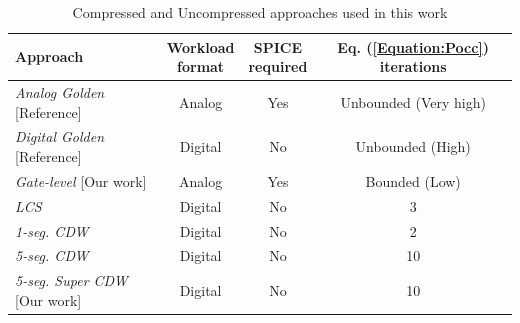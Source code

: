 \begin{table}
    \caption{Compressed and Uncompressed approaches used in this work}
    \begin{center}
    \addtolength{\tabcolsep}{-0.2em}
       \begin{tabular}{@{}lccc@{}}\toprule
        Approach & \makecell{Workload \\ format} & \makecell{ SPICE \\ required} & Eq. (\ref{Equation:Pocc}) iterations \\ \midrule
        \textit{Analog Golden} [Reference] & Analog & Yes & Unbounded (Very high) \\
        \textit{Digital Golden} [Reference] & Digital & No & Unbounded (High) \\
        \textit{Gate-level} [Our work] & Analog & Yes & Bounded (Low)  \\
        \textit{LCS} \cite{vansantenDesigningGuardbandsInstantaneous2016} & Digital & No &  3 \\
        \textit{1-seg. CDW} \cite{AtomisticPseudoRodopoulos2014} & Digital & No &  2 \\
        \textit{5-seg. CDW} \cite{AtomisticPseudoRodopoulos2014} & Digital & No &  10 \\
        \textit{5-seg. Super CDW} [Our work] & Digital & No &  10 \\ \bottomrule
    \end{tabular}     
    \end{center}
    \label{tab:approaches}
\end{table} 

